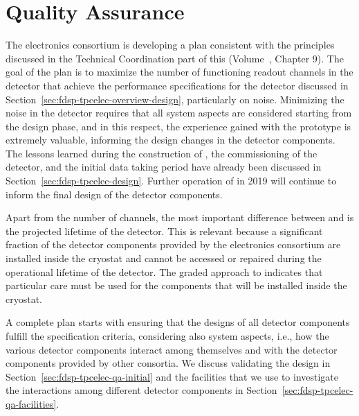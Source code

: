 \section{Quality Assurance}
\label{sec:fdsp-tpcelec-qa}

The  electronics consortium is developing a  plan consistent
with the principles discussed in the Technical Coordination part of this 
 (Volume~\volnumbertc, Chapter 9). %
The goal of the  plan is to maximize the number of functioning
readout channels in the detector that achieve the performance specifications
for the detector discussed in Section~\ref{sec:fdsp-tpcelec-overview-design},
particularly on noise. Minimizing the noise in the detector requires that all
system aspects are considered starting from the design phase, and in this
respect, the experience gained with the  prototype is extremely
valuable, informing the design changes in the detector 
components. The lessons learned during the construction of ,
the commissioning of the detector, and the initial data taking period have
already been discussed in Section~\ref{sec:fdsp-tpcelec-design}. Further
operation of  in 2019 will continue to inform the final design
of the detector components.

Apart from the number of channels, the most important difference
between  and  is the projected lifetime of the detector. This
is relevant because a significant fraction of the detector components provided 
by the  electronics consortium are installed inside the cryostat and cannot 
be accessed or repaired during the operational lifetime of the detector. The 
graded approach to  indicates that particular care must be used for
the  components that will be installed inside the cryostat.

A complete  plan starts with ensuring that the designs of all
detector components fulfill the specification criteria, considering
also system aspects, i.e., how the various detector components interact
among themselves and with the detector components provided by other 
consortia. We discuss validating the design in 
Section~\ref{sec:fdsp-tpcelec-qa-initial} and the facilities that we use
to investigate the interactions among different detector components
in Section~\ref{sec:fdsp-tpcelec-qa-facilities}. 

